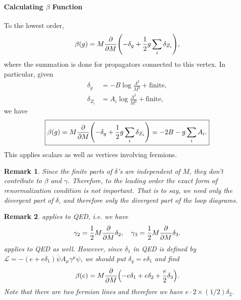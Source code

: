 \documentclass{article}
\newtheorem{myrm}{Remark}
\begin{document}
\paragraph{Calculating $\beta$ Function}
To the lowest order,
\begin{equation}
    \label{eq:beta_lowest_delta}
    \beta(g) = M\pdv{M}\qty(-\delta_g + \frac{1}{2}g\sum_i \delta_{Z_i}),
\end{equation}
where the summation is done for propagators connected to this vertex.
In particular, given
\begin{align*}
    \delta_g &= -B \log \frac{\Lambda^2}{M^2} + \text{finite}, \\
    \delta_{Z_i} &= A_i \log \frac{\Lambda^2}{M^2} + \text{finite}, 
\end{align*}
we have
\begin{equation}
    \label{eq:beta_lowest}
    \boxed{\beta(g) = M\pdv{M}\qty(-\delta_g + \frac{1}{2}g\sum_i \delta_{Z_i}) = -2B - g\sum_i A_i.}
\end{equation}
This applies scalars as well as vertices involving fermions.

\begin{myrm}
    Since the finite parts of $\delta$'s are independent of $M$, they don't contribute to $\beta$ and $\gamma$.
    Therefore, to the leading order the exact form of renormalization condition is not important.
    That is to say, we need only the divergent part of $\delta$, and therefore only the divergent part of the loop diagrams.
\end{myrm}

\begin{myrm}
     applies to QED, i.e. we have
    \[ \gamma_2 = \frac{1}{2}M\pdv{M}\delta_2,\quad \gamma_3 = \frac{1}{2}M\pdv{M}\delta_3. \]
     applies to QED as well.
    However, since $\delta_1$ in QED is defined by $\mathcal{L} = -(e+e\delta_1) \overline{\psi}A_\mu \gamma^\mu \psi$, we should put $\delta_g = e\delta_1$ and find
    \[ \beta(e) = M\pdv{M}\qty(-e\delta_1 + e\delta_2 + \frac{e}{2}\delta_3). \]
    Note that there are two fermion lines and therefore we have $e\cdot 2\times (1/2)\delta_2$.
\end{myrm}

% 
% 
\end{document}
